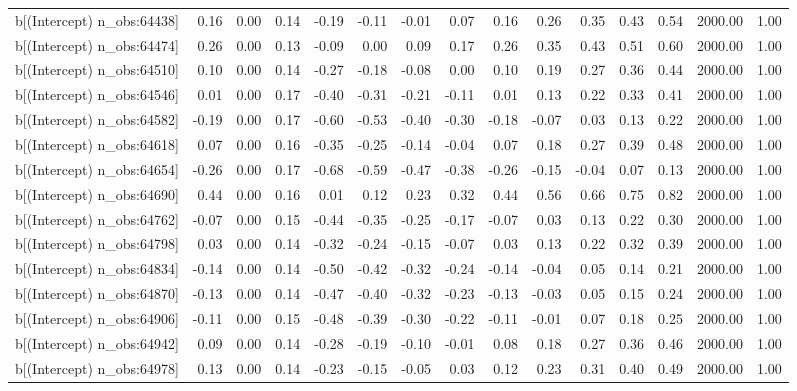 \begin{table}[ht]
\begin{tabular}{rrrrrrrrrrrrrrr}
  b[(Intercept) n\_obs:64438] & 0.16 & 0.00 & 0.14 & -0.19 & -0.11 & -0.01 & 0.07 & 0.16 & 0.26 & 0.35 & 0.43 & 0.54 & 2000.00 & 1.00 \\ 
  b[(Intercept) n\_obs:64474] & 0.26 & 0.00 & 0.13 & -0.09 & 0.00 & 0.09 & 0.17 & 0.26 & 0.35 & 0.43 & 0.51 & 0.60 & 2000.00 & 1.00 \\ 
  b[(Intercept) n\_obs:64510] & 0.10 & 0.00 & 0.14 & -0.27 & -0.18 & -0.08 & 0.00 & 0.10 & 0.19 & 0.27 & 0.36 & 0.44 & 2000.00 & 1.00 \\ 
  b[(Intercept) n\_obs:64546] & 0.01 & 0.00 & 0.17 & -0.40 & -0.31 & -0.21 & -0.11 & 0.01 & 0.13 & 0.22 & 0.33 & 0.41 & 2000.00 & 1.00 \\ 
  b[(Intercept) n\_obs:64582] & -0.19 & 0.00 & 0.17 & -0.60 & -0.53 & -0.40 & -0.30 & -0.18 & -0.07 & 0.03 & 0.13 & 0.22 & 2000.00 & 1.00 \\ 
  b[(Intercept) n\_obs:64618] & 0.07 & 0.00 & 0.16 & -0.35 & -0.25 & -0.14 & -0.04 & 0.07 & 0.18 & 0.27 & 0.39 & 0.48 & 2000.00 & 1.00 \\ 
  b[(Intercept) n\_obs:64654] & -0.26 & 0.00 & 0.17 & -0.68 & -0.59 & -0.47 & -0.38 & -0.26 & -0.15 & -0.04 & 0.07 & 0.13 & 2000.00 & 1.00 \\ 
  b[(Intercept) n\_obs:64690] & 0.44 & 0.00 & 0.16 & 0.01 & 0.12 & 0.23 & 0.32 & 0.44 & 0.56 & 0.66 & 0.75 & 0.82 & 2000.00 & 1.00 \\ 
  b[(Intercept) n\_obs:64762] & -0.07 & 0.00 & 0.15 & -0.44 & -0.35 & -0.25 & -0.17 & -0.07 & 0.03 & 0.13 & 0.22 & 0.30 & 2000.00 & 1.00 \\ 
  b[(Intercept) n\_obs:64798] & 0.03 & 0.00 & 0.14 & -0.32 & -0.24 & -0.15 & -0.07 & 0.03 & 0.13 & 0.22 & 0.32 & 0.39 & 2000.00 & 1.00 \\ 
  b[(Intercept) n\_obs:64834] & -0.14 & 0.00 & 0.14 & -0.50 & -0.42 & -0.32 & -0.24 & -0.14 & -0.04 & 0.05 & 0.14 & 0.21 & 2000.00 & 1.00 \\ 
  b[(Intercept) n\_obs:64870] & -0.13 & 0.00 & 0.14 & -0.47 & -0.40 & -0.32 & -0.23 & -0.13 & -0.03 & 0.05 & 0.15 & 0.24 & 2000.00 & 1.00 \\ 
  b[(Intercept) n\_obs:64906] & -0.11 & 0.00 & 0.15 & -0.48 & -0.39 & -0.30 & -0.22 & -0.11 & -0.01 & 0.07 & 0.18 & 0.25 & 2000.00 & 1.00 \\ 
  b[(Intercept) n\_obs:64942] & 0.09 & 0.00 & 0.14 & -0.28 & -0.19 & -0.10 & -0.01 & 0.08 & 0.18 & 0.27 & 0.36 & 0.46 & 2000.00 & 1.00 \\ 
  b[(Intercept) n\_obs:64978] & 0.13 & 0.00 & 0.14 & -0.23 & -0.15 & -0.05 & 0.03 & 0.12 & 0.23 & 0.31 & 0.40 & 0.49 & 2000.00 & 1.00 \\ 

\end{tabular}
\end{table}
